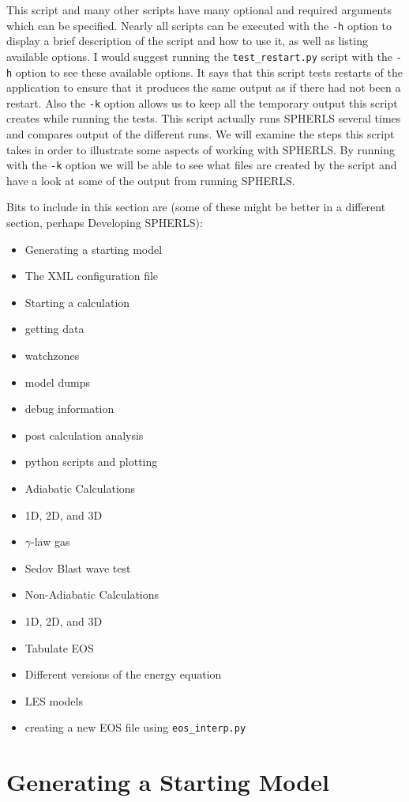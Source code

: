 \documentclass[12pt,a4paper]{book}
\begin{document}
This script and many other scripts have many optional and required arguments which can be specified.  Nearly all scripts can be executed with the {\tt -h} option to display a brief description of the script and how to use it, as well as listing available options. I would suggest running the {\tt test\_restart.py} script with the {\tt -h} option to see these available options. It says that this script tests restarts of the application to ensure that it produces the same output as if there had not been a restart. Also the {\tt -k} option allows us to keep all the temporary output this script creates while running the tests. This script actually runs SPHERLS several times and compares output of the different runs. We will examine the steps this script takes in order to illustrate some aspects of working with SPHERLS. By running with the {\tt -k} option we will be able to see what files are created by the script and have a look at some of the output from running SPHERLS.


Bits to include in this section are (some of these might be better in a different section, perhaps Developing SPHERLS):
\begin{itemize}
\item Generating a starting model
\item The XML configuration file
\item Starting a calculation
\item getting data
\item watchzones
\item model dumps
\item debug information
\item post calculation analysis
\item python scripts and plotting
\item Adiabatic Calculations
\item 1D, 2D, and 3D
\item $\gamma$-law gas
\item Sedov Blast wave test
\item Non-Adiabatic Calculations
\item 1D, 2D, and 3D
\item Tabulate EOS
\item Different versions of the energy equation
\item LES models
\item creating a new EOS file using {\tt eos\_interp.py}
\end{itemize}

\section{Generating a Starting Model}
\end{document}
